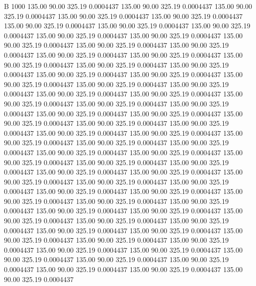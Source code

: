 


B 1000
 135.00   90.00  325.19   0.0004437
 135.00   90.00  325.19   0.0004437
 135.00   90.00  325.19   0.0004437
 135.00   90.00  325.19   0.0004437
 135.00   90.00  325.19   0.0004437
 135.00   90.00  325.19   0.0004437
 135.00   90.00  325.19   0.0004437
 135.00   90.00  325.19   0.0004437
 135.00   90.00  325.19   0.0004437
 135.00   90.00  325.19   0.0004437
 135.00   90.00  325.19   0.0004437
 135.00   90.00  325.19   0.0004437
 135.00   90.00  325.19   0.0004437
 135.00   90.00  325.19   0.0004437
 135.00   90.00  325.19   0.0004437
 135.00   90.00  325.19   0.0004437
 135.00   90.00  325.19   0.0004437
 135.00   90.00  325.19   0.0004437
 135.00   90.00  325.19   0.0004437
 135.00   90.00  325.19   0.0004437
 135.00   90.00  325.19   0.0004437
 135.00   90.00  325.19   0.0004437
 135.00   90.00  325.19   0.0004437
 135.00   90.00  325.19   0.0004437
 135.00   90.00  325.19   0.0004437
 135.00   90.00  325.19   0.0004437
 135.00   90.00  325.19   0.0004437
 135.00   90.00  325.19   0.0004437
 135.00   90.00  325.19   0.0004437
 135.00   90.00  325.19   0.0004437
 135.00   90.00  325.19   0.0004437
 135.00   90.00  325.19   0.0004437
 135.00   90.00  325.19   0.0004437
 135.00   90.00  325.19   0.0004437
 135.00   90.00  325.19   0.0004437
 135.00   90.00  325.19   0.0004437
 135.00   90.00  325.19   0.0004437
 135.00   90.00  325.19   0.0004437
 135.00   90.00  325.19   0.0004437
 135.00   90.00  325.19   0.0004437
 135.00   90.00  325.19   0.0004437
 135.00   90.00  325.19   0.0004437
 135.00   90.00  325.19   0.0004437
 135.00   90.00  325.19   0.0004437
 135.00   90.00  325.19   0.0004437
 135.00   90.00  325.19   0.0004437
 135.00   90.00  325.19   0.0004437
 135.00   90.00  325.19   0.0004437
 135.00   90.00  325.19   0.0004437
 135.00   90.00  325.19   0.0004437
 135.00   90.00  325.19   0.0004437
 135.00   90.00  325.19   0.0004437
 135.00   90.00  325.19   0.0004437
 135.00   90.00  325.19   0.0004437
 135.00   90.00  325.19   0.0004437
 135.00   90.00  325.19   0.0004437
 135.00   90.00  325.19   0.0004437
 135.00   90.00  325.19   0.0004437
 135.00   90.00  325.19   0.0004437
 135.00   90.00  325.19   0.0004437
 135.00   90.00  325.19   0.0004437
 135.00   90.00  325.19   0.0004437
 135.00   90.00  325.19   0.0004437
 135.00   90.00  325.19   0.0004437
 135.00   90.00  325.19   0.0004437
 135.00   90.00  325.19   0.0004437
 135.00   90.00  325.19   0.0004437
 135.00   90.00  325.19   0.0004437
 135.00   90.00  325.19   0.0004437
 135.00   90.00  325.19   0.0004437
 135.00   90.00  325.19   0.0004437
